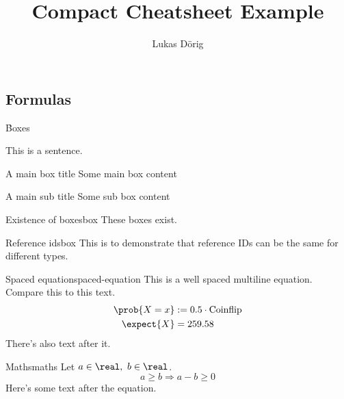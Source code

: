 \def\lutilpath{../..}



\title{Compact Cheatsheet Example}
\author{Lukas Dörig}





\begin{multicols*}{3}

  \maketitle

  \part{Formulas}

  \h{Boxes}


  This is a sentence.

  \begin{mainbox}{A main box title}
    Some main box content
  \end{mainbox}

  \begin{subbox}{A main sub title}
    Some sub box content
  \end{subbox}


  \begin{axiom}{Existence of boxes}{box}
    These boxes exist.
  \end{axiom}

  \begin{remark}{Reference ids}{box}
    This is to demonstrate that reference IDs can be the same for different types.
  \end{remark}

  \begin{definition}{Spaced equation}{spaced-equation}
    This is a well spaced multiline equation. Compare this to this text.
    \begin{align*}
      \prob{X = x} & := 0.5 \cdot \text{Coinflip} \\
      \expect{X} & = 259.58
    \end{align*}
    There's also text after it.
  \end{definition}

  \begin{corollary}{Maths}{maths}
    Let $a \in \real,\ b \in \real$.
    \[
      a \geq b \Rightarrow a - b \geq 0
    \]
    Here's some text after the equation.
  \end{corollary}


\end{multicols*}
